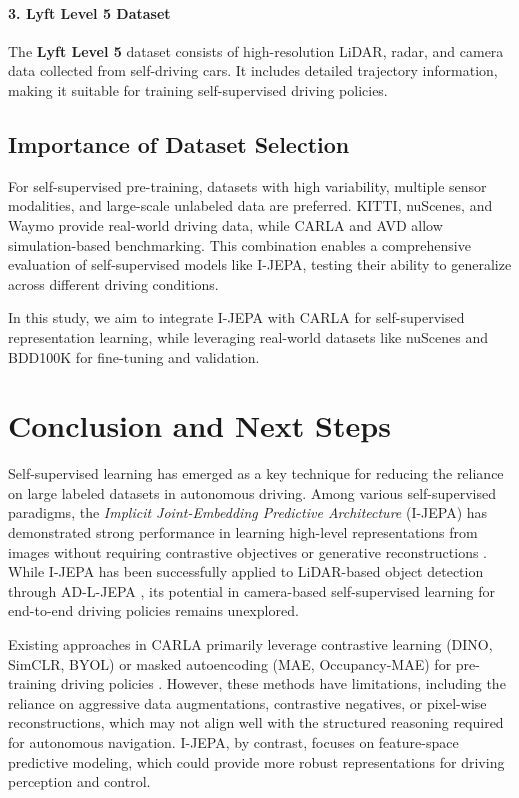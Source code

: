 \documentclass{article}
\begin{document}
\paragraph{3. Lyft Level 5 Dataset} 
The \textbf{Lyft Level 5} dataset \citep{houston2020lyft} consists of high-resolution LiDAR, radar, and camera data collected from self-driving cars. It includes detailed trajectory information, making it suitable for training self-supervised driving policies.

\subsection{Importance of Dataset Selection}
For self-supervised pre-training, datasets with high variability, multiple sensor modalities, and large-scale unlabeled data are preferred. KITTI, nuScenes, and Waymo provide real-world driving data, while CARLA and AVD allow simulation-based benchmarking. This combination enables a comprehensive evaluation of self-supervised models like I-JEPA, testing their ability to generalize across different driving conditions.

In this study, we aim to integrate I-JEPA with CARLA for self-supervised representation learning, while leveraging real-world datasets like nuScenes and BDD100K for fine-tuning and validation.
\section{Conclusion and Next Steps}

Self-supervised learning has emerged as a key technique for reducing the reliance on large labeled datasets in autonomous driving. Among various self-supervised paradigms, the \textit{Implicit Joint-Embedding Predictive Architecture} (I-JEPA) has demonstrated strong performance in learning high-level representations from images without requiring contrastive objectives or generative reconstructions \citep{jean2023ijepa}. While I-JEPA has been successfully applied to LiDAR-based object detection through AD-L-JEPA \citep{zhu2025adljepa}, its potential in camera-based self-supervised learning for end-to-end driving policies remains unexplored.

Existing approaches in CARLA primarily leverage contrastive learning (DINO, SimCLR, BYOL) or masked autoencoding (MAE, Occupancy-MAE) for pre-training driving policies \citep{carla_dino2024, carla_ssl2024}. However, these methods have limitations, including the reliance on aggressive data augmentations, contrastive negatives, or pixel-wise reconstructions, which may not align well with the structured reasoning required for autonomous navigation. I-JEPA, by contrast, focuses on feature-space predictive modeling, which could provide more robust representations for driving perception and control.
\end{document}
